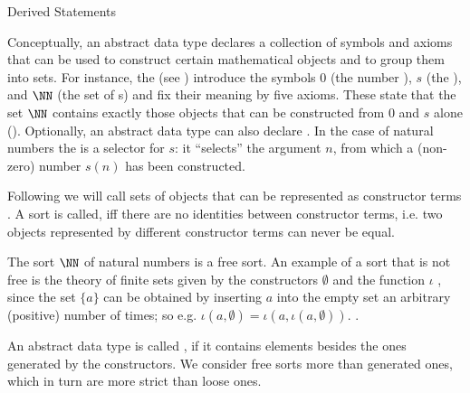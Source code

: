 \begin{omgroup}{Derived Statements}
\begin{module}[id=adt]
\begin{omgroup}[id=adt,short=Abstract Data Types]
\begin{module}[id=adt]
\begin{omtext}
  Conceptually, an abstract data type declares a collection of symbols and axioms that can
  be used to construct certain mathematical objects and to group them into sets. For
  instance, the {} (see {}) introduce the symbols
  $0$ (the number {}), $s$ (the {}), and $\NN$
  (the set of {s}) and fix their meaning by five axioms. These
  state that the set $\NN$ contains exactly those objects that can be constructed from $0$
  and $s$ alone (). Optionally, an abstract data type can
  also declare . In the case of natural numbers the {} is
  a selector for $s$: it ``selects'' the argument $n$, from which a (non-zero) number
  $s(n)$ has been constructed.
\end{omtext}

\begin{definition}[display=flow,id=free.def]
  Following {\casl} we will call sets of objects that can be represented as constructor
  terms . A sort is called, iff there are no identities between
  constructor terms, i.e.  two objects represented by different constructor terms can
  never be equal.
\end{definition}

\begin{omtext}
  The sort $\NN$ of natural numbers is a free sort. An example of a sort that is not free
  is the theory of finite sets given by the constructors $\emptyset$ and the
  {} function $\iota$ , since the set $\{a\}$ can be obtained by
  inserting $a$ into the empty set an arbitrary (positive) number of times; so
  e.g. $\iota(a,\emptyset)=\iota(a,\iota(a,\emptyset))$. .
\end{omtext}

\begin{definition}[display=flow,id=generated.def]
  An abstract data type is called , if it contains elements besides the
  ones generated by the constructors. We consider free sorts more  than
  generated ones, which in turn are more strict than loose ones.
\end{definition}


\end{module}
\end{omgroup}
\end{module}
\end{omgroup}
